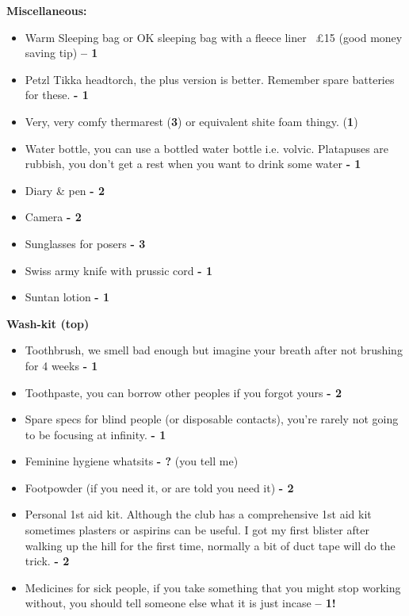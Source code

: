 \textbf{Miscellaneous:}
\begin{itemize}
    \item Warm Sleeping bag or OK sleeping bag with a fleece liner ~£15 (good money saving tip) \textbf{– 1}
    \item Petzl Tikka headtorch, the plus version is better. Remember spare batteries for these. \textbf{- 1}
    \item Very, very comfy thermarest (\textbf{3}) or equivalent shite foam thingy. (\textbf{1})
    \item Water bottle, you can use a bottled water bottle i.e. volvic. Platapuses are rubbish, you don’t get a rest when you want to drink some water \textbf{- 1}
    \item Diary \& pen \textbf{- 2}
    \item Camera \textbf{- 2}
    \item Sunglasses for posers \textbf{- 3}
    \item Swiss army knife with prussic cord \textbf{- 1}
    \item Suntan lotion \textbf{- 1}
\end{itemize}

\textbf{Wash-kit (top)}
\begin{itemize}
    \item Toothbrush, we smell bad enough but imagine your breath after not brushing for 4 weeks \textbf{- 1}
    \item Toothpaste, you can borrow other peoples if you forgot yours \textbf{- 2}
    \item Spare specs for blind people (or disposable contacts), you’re rarely not going to be focusing at infinity. \textbf{- 1}
    \item Feminine hygiene whatsits \textbf{- ?} (you tell me) 
    \item Footpowder (if you need it, or are told you need it) \textbf{- 2}
    \item Personal 1st aid kit. Although the club has a comprehensive 1st aid kit sometimes plasters or aspirins can be useful. I got my first blister after walking up the hill for the first time, normally a bit of duct tape will do the trick. \textbf{- 2}
    \item Medicines for sick people, if you take something that you might stop working without, you should tell someone else what it is just incase \textbf{– 1!}
\end{itemize}

